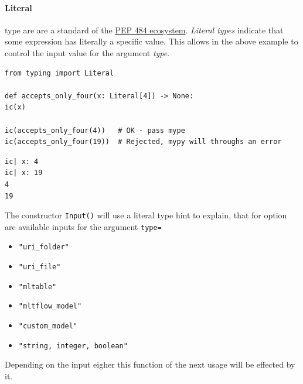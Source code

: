 \paragraph{Literal} type are are a standard of the \href{https://peps.python.org/pep-0586/}{PEP 484 ecosystem}. \textit{Literal types} indicate that some expression has literally a specific value. This allows in the above example to control the input value for the argument \textit{type}.
\begin{lstlisting}[language=iPython,  caption={Exmample Usage Input()},captionpos=b]
from typing import Literal

def accepts_only_four(x: Literal[4]) -> None:
ic(x)

ic(accepts_only_four(4))   # OK - pass mype
ic(accepts_only_four(19))  # Rejected, mypy will throughs an error
\end{lstlisting}

\begin{lstlisting}[style=CMD]
ic| x: 4
ic| x: 19
4
19
\end{lstlisting}

The constructor \verb+Input()+ will use a literal type hint to explain, that for option are available inputs for the argument \verb+type=+
\begin{itemize}
	\item \verb+"uri_folder"+
	\item \verb+"uri_file"+
	\item \verb+"mltable"+
	\item \verb+"mltflow_model"+
	\item \verb+"custom_model"+
	\item \verb+"string, integer, boolean"+
\end{itemize}
Depending on the input eigher this function of the next usage will be effected by it.
